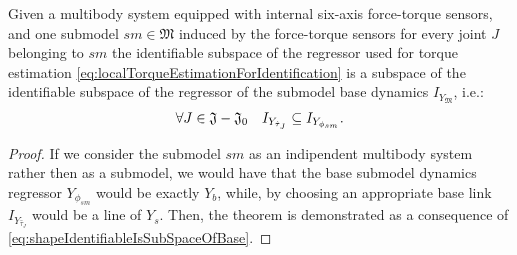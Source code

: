 \begin{theorem}
 Given a multibody system equipped with internal six-axis force-torque sensors, and one submodel $sm \in \mathfrak{M}$ induced by the force-torque sensors for every joint $J$ belonging to $sm$ the identifiable subspace of the regressor used for torque estimation  \eqref{eq:localTorqueEstimationForIdentification} is a subspace of the identifiable subspace of the regressor of the submodel base dynamics $I_{Y_{\mathfrak{M}}}$, i.e.: 
 \begin{equation}
 \label{eq:subModelIdentifiableIsMoreThanSubmodelJointRegressors}
\forall J \in \mathfrak{J}-\mathfrak{J}_0 \ \ \
I_{Y_{\hat{\tau}_{J}}} \subseteq I_{Y_{\phi_{sm}}} .
 \end{equation}
\end{theorem}
\begin{proof}
If we consider the submodel $sm$ as an indipendent multibody system rather then as a submodel, we would have that the base submodel dynamics regressor $Y_{\phi_{sm}}$ would be exactly $Y_{b}$, while, by choosing an appropriate base link $I_{Y_{\hat{\tau}_{J}}}$ would be a line of $Y_s$. Then, the theorem is demonstrated as a consequence of \eqref{eq:shapeIdentifiableIsSubSpaceOfBase}.
\end{proof}
